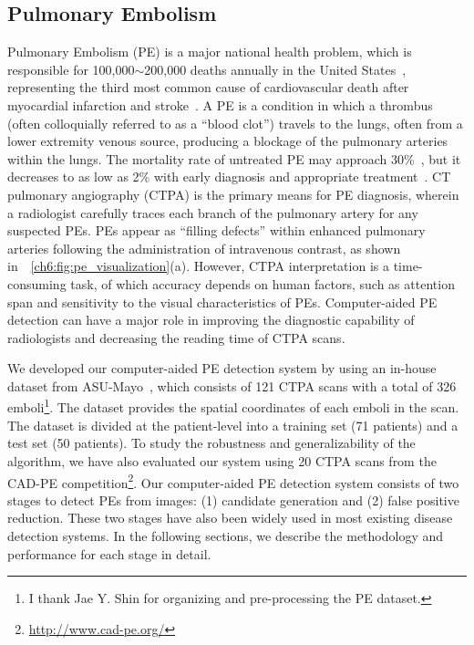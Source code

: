\subsection{Pulmonary Embolism}
\label{ch6:medical_applications:pe_introduction}

Pulmonary Embolism (PE) is a major national health problem, which is responsible for 100,000$\sim$200,000 deaths annually in the United States~\citep{pauley2019age}, representing the third most common cause of cardiovascular death after myocardial infarction and stroke~\citep{martin2020time}. A PE is a condition in which a thrombus (often colloquially referred to as a ``blood clot'') travels to the lungs, often from a lower extremity venous source, producing a blockage of the pulmonary arteries within the lungs. The mortality rate of untreated PE may approach 30\%~\citep{calder2005mortality}, but it decreases to as low as 2\% with early diagnosis and appropriate treatment~\citep{sadigh2011challenges}. CT pulmonary angiography (CTPA) is the primary means for PE diagnosis, wherein a radiologist carefully traces each branch of the pulmonary artery for any suspected PEs. PEs appear as ``filling defects'' within enhanced pulmonary arteries following the administration of intravenous contrast, as shown in~\figureautorefname~\ref{ch6:fig:pe_visualization}(a). However, CTPA interpretation is a time-consuming task, of which accuracy depends on human factors, such as attention span and sensitivity to the visual characteristics of PEs. Computer-aided PE detection can have a major role in improving the diagnostic capability of radiologists and decreasing the reading time of CTPA scans.

We developed our computer-aided PE detection system by using an in-house dataset from ASU-Mayo~\citep{tajbakhsh2019computer}, which consists of 121 CTPA scans with a total of 326 emboli\footnote{I thank Jae Y. Shin for organizing and pre-processing the PE dataset.}. The dataset provides the spatial coordinates of each emboli in the scan. The dataset is divided at the patient-level into a training set (71 patients) and a test set (50 patients). To study the robustness and generalizability of the algorithm, we have also evaluated our system using 20 CTPA scans from the CAD-PE competition\footnote{\href{http://www.cad-pe.org/}{http://www.cad-pe.org/}}. Our computer-aided PE detection system consists of two stages to detect PEs from images: (1) candidate generation and (2) false positive reduction. These two stages have also been widely used in most existing disease detection systems. In the following sections, we describe the methodology and performance for each stage in detail.





